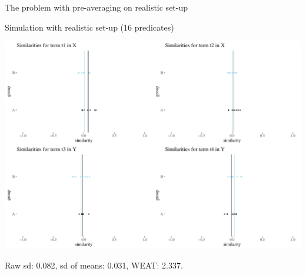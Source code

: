 \documentclass[
  10pt,
  ignorenonframetext,
  x11names, dvipsnames, bibspacing,natbib, table]{beamer}
\begin{document}
\begin{frame}{The problem with pre-averaging on realistic set-up}
\protect\hypertarget{the-problem-with-pre-averaging-on-realistic-set-up}{}
\begin{block}{Simulation with realistic set-up (16 predicates)}
\protect\hypertarget{simulation-with-realistic-set-up-16-predicates}{}
\vspace{1mm}
\footnotesize

\begin{center}\includegraphics[width=0.7\linewidth]{presentationBoston_files/figure-beamer/unnamed-chunk-8-1} \end{center}

\footnotesize

\vspace{-2mm}

Raw sd: 0.082, sd of means: 0.031, WEAT: 2.337.
\end{block}
\end{frame}
\end{document}
